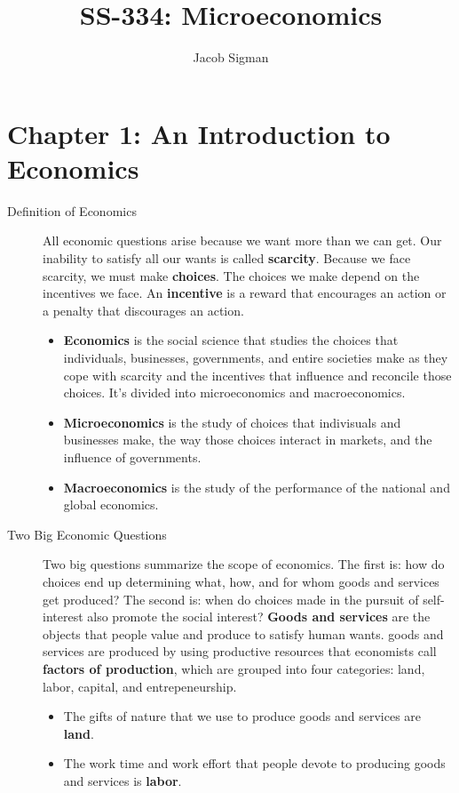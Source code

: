 \documentclass{article}
\title{SS-334: Microeconomics}
\author{Jacob Sigman}
\date{}
\begin{document}
\maketitle
\section*{Chapter 1: An Introduction to Economics}
\begin{description}
    \item [Definition of Economics] All economic questions arise because we want more than we can get. Our inability to satisfy all our wants is called \textbf{scarcity}. Because we face scarcity, we must make \textbf{choices}. The choices we make depend on the incentives we face. An \textbf{incentive} is a reward that encourages an action or a penalty that discourages an action.
    \begin{itemize}
        \item \textbf{Economics} is the social science that studies the choices that individuals, businesses, governments, and entire societies make as they cope with scarcity and the incentives that influence and reconcile those choices. It's divided into microeconomics and macroeconomics.
        \item \textbf{Microeconomics} is the study of choices that indivisuals and businesses make, the way those choices interact in markets, and the influence of governments.
        \item \textbf{Macroeconomics} is the study of the performance of the national and global economics.
    \end{itemize}
    \item [Two Big Economic Questions] Two big questions summarize the scope of economics. The first is: how do choices end up determining what, how, and for whom goods and services get produced? The second is: when do choices made in the pursuit of self-interest also promote the social interest? \textbf{Goods and services} are the objects that people value and produce to satisfy human wants. goods and services are produced by using productive resources that economists call \textbf{factors of production}, which are grouped into four categories: land, labor, capital, and entrepeneurship.
    \begin{itemize}
        \item The gifts of nature that we use to produce goods and services are \textbf{land}.
        \item The work time and work effort that people devote to producing goods and services is \textbf{labor}.

\end{itemize}
\end{description}
\end{document}
